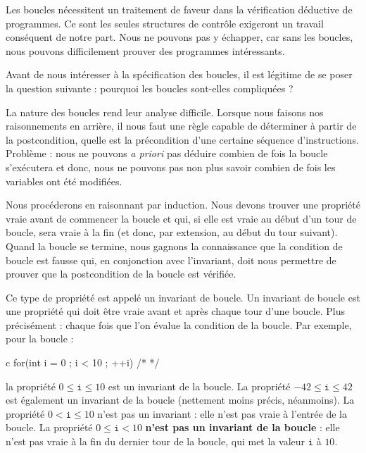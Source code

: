 Les boucles nécessitent un traitement de faveur dans la vérification déductive
de programmes. Ce sont les seules structures de contrôle exigeront un
travail conséquent de notre part. Nous ne pouvons pas y échapper, car sans les
boucles, nous pouvons difficilement prouver des programmes intéressants.



Avant de nous intéresser à la spécification des boucles, il est légitime de se
poser la question suivante : pourquoi les boucles sont-elles compliquées ?



\label{l3:statements-loops-invariant}


La nature des boucles rend leur analyse difficile. Lorsque nous faisons nos
raisonnements en arrière, il nous faut une règle capable de déterminer à partir
de la postcondition, quelle est la précondition d'une certaine séquence
d'instructions. Problème : nous ne pouvons \textit{a priori} pas déduire combien de
fois la boucle s'exécutera et donc, nous ne pouvons pas non
plus savoir combien de fois les variables ont été modifiées.



Nous procéderons en raisonnant par induction. Nous devons trouver une
propriété vraie avant de commencer la boucle et qui, si elle est vraie
au début d'un tour de boucle, sera vraie à la fin (et donc, par extension, au
début du tour suivant). Quand la boucle se termine, nous gagnons la connaissance
que la condition de boucle est fausse qui, en conjonction avec l'invariant,
doit nous permettre de prouver que la postcondition de la boucle est vérifiée.



Ce type de propriété est appelé un invariant de boucle. Un invariant de boucle
est une propriété qui doit être vraie avant et après chaque tour d'une boucle.
Plus précisément : chaque fois que l'on évalue la condition de la boucle.
Par exemple, pour la boucle :
\begin{CodeBlock}{c}
for(int i = 0 ; i < 10 ; ++i){ /* */ }
\end{CodeBlock}
la propriété $0 \leq \texttt{i} \leq 10$ est un invariant de la boucle. La
propriété $-42 \leq \texttt{i} \leq 42$ est également un invariant de la boucle
(nettement moins précis, néanmoins). La propriété $0 < \texttt{i} \leq 10$
n'est pas un invariant : elle n'est pas vraie à l'entrée de la boucle. La propriété
$0 \leq \texttt{i} < 10$ \textbf{n'est pas un invariant de la boucle} : elle n'est
pas vraie à la fin du dernier tour de la boucle, qui met la valeur $\texttt{i}$ à
$10$.



